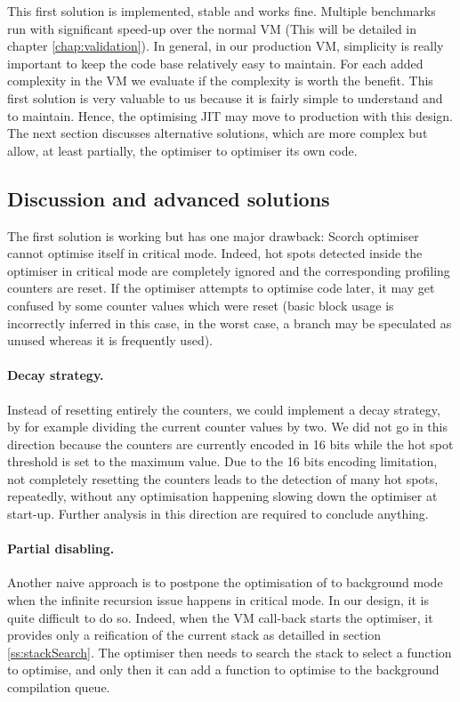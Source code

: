 \documentclass[a4paper,12pt,twoside]{../includes/ThesisStyle}
\begin{document}
This first solution is implemented, stable and works fine. Multiple benchmarks run with significant speed-up over the normal VM (This will be detailed in chapter \ref{chap:validation}). In general, in our production VM, simplicity is really important to keep the code base relatively easy to maintain. For each added complexity in the VM we evaluate if the complexity is worth the benefit. This first solution is very valuable to us because it is fairly simple to understand and to maintain. Hence, the optimising JIT may move to production with this design. The next section discusses alternative solutions, which are more complex but allow, at least partially, the optimiser to optimiser its own code.

\subsection{Discussion and advanced solutions}

The first solution is working but has one major drawback: Scorch optimiser cannot optimise itself in critical mode. Indeed, hot spots detected inside the optimiser in critical mode are completely ignored and the corresponding profiling counters are reset. If the optimiser attempts to optimise code later, it may get confused by some counter values which were reset (basic block usage is incorrectly inferred in this case, in the worst case, a branch may be speculated as unused whereas it is frequently used). 

\paragraph{Decay strategy.} Instead of resetting entirely the counters, we could implement a decay strategy, by for example dividing the current counter values by two. We did not go in this direction because the counters are currently encoded in 16 bits while the hot spot threshold is set to the maximum value. Due to the 16 bits encoding limitation, not completely resetting the counters leads to the detection of many hot spots, repeatedly, without any optimisation happening slowing down the optimiser at start-up. Further analysis in this direction are required to conclude anything.

\paragraph{Partial disabling.} Another naive approach is to postpone the optimisation of to background mode when the infinite recursion issue happens in critical mode. In our design, it is quite difficult to do so. Indeed, when the VM call-back starts the optimiser, it provides only a reification of the current stack as detailled in section \ref{ss:stackSearch}. The optimiser then needs to search the stack to select a function to optimise, and only then it can add a function to optimise to the background compilation queue. 
\end{document}
